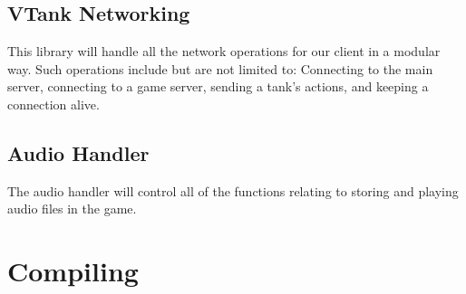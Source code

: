 \begin{center}
\begin{figure}
	\centering
	\label{fig:Renderer Class Diagram}
\end{figure}
\end{center}

\subsection{VTank Networking}

This library will handle all the network operations for our client in a modular way. Such operations include but are not limited to: Connecting to the main server, connecting to a game server, sending a tank's actions, and keeping a connection alive.
  
\subsection{Audio Handler}

The audio handler will control all of the functions relating to storing and playing audio files in the game.

\section{Compiling}


